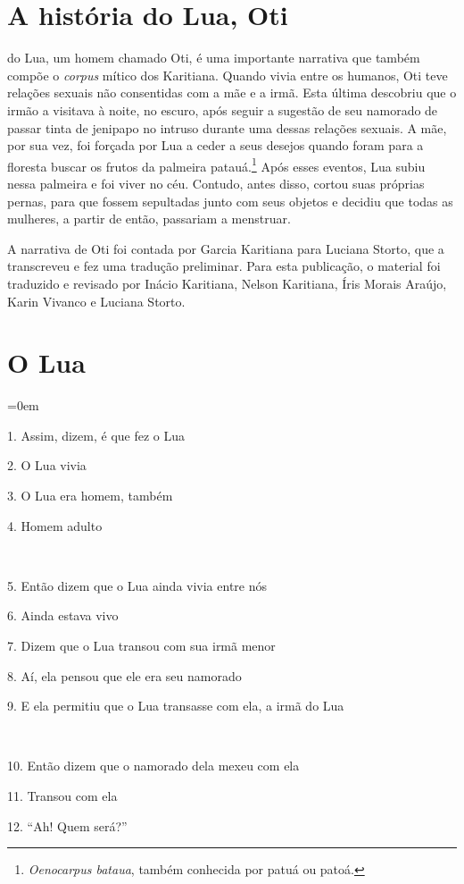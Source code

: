 \chapter{A história do Lua, Oti}

 do Lua, um homem chamado Oti, é uma importante narrativa que
também compõe o \emph{corpus} mítico dos Karitiana. Quando vivia entre
os humanos, Oti teve relações sexuais não consentidas com a mãe e a
irmã. Esta última descobriu que o irmão a visitava à noite, no escuro,
após seguir a sugestão de seu namorado de passar tinta de jenipapo no
intruso durante uma dessas relações sexuais. A mãe, por sua vez, foi
forçada por Lua a ceder a seus desejos quando foram para a floresta
buscar os frutos da palmeira patauá.\footnote{\emph{Oenocarpus bataua},
  também conhecida por patuá ou patoá.} Após esses eventos, Lua subiu
nessa palmeira e foi viver no céu. Contudo, antes disso, cortou suas
próprias pernas, para que fossem sepultadas junto com seus objetos e
decidiu que todas as mulheres, a partir de então, passariam a menstruar.

A narrativa de Oti foi contada por Garcia Karitiana para Luciana Storto,
que a transcreveu e fez uma tradução preliminar. Para esta publicação, o
material foi traduzido e revisado por Inácio Karitiana, Nelson
Karitiana, Íris Morais Araújo, Karin Vivanco e Luciana Storto.


\chapter*{O Lua}\parindent=0em

1. Assim, dizem, é que fez o Lua

2. O Lua vivia

3. O Lua era homem, também

4. Homem adulto

~

5. Então dizem que o Lua ainda vivia entre nós

6. Ainda estava vivo

7. Dizem que o Lua transou com sua irmã menor

8. Aí, ela pensou que ele era seu namorado

9. E ela permitiu que o Lua transasse com ela, a irmã do Lua

~

10. Então dizem que o namorado dela mexeu com ela

11. Transou com ela

12. ``Ah! Quem será?''

